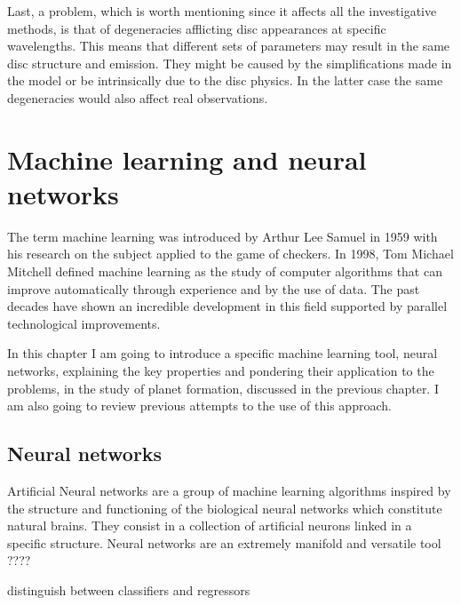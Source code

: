 \documentclass[a4paper,10pt]{report}
\begin{document}
Last, a problem, which is worth mentioning since it affects all the investigative methods,
is that of degeneracies afflicting disc appearances at specific
wavelengths. This means that different sets of parameters may result in the same disc structure and emission.
They might be caused by the simplifications made in the model or be intrinsically due to the disc physics. 
In the latter case the same degeneracies would also affect real observations.

\chapter{Machine learning and neural networks}

The term machine learning was introduced by Arthur Lee Samuel in 1959
with his research on the subject applied to the game of checkers.
In 1998, Tom Michael Mitchell defined machine learning as the study of
computer algorithms that can improve automatically through experience and by the use of data.
The past decades have shown an incredible development in this field supported by parallel 
technological improvements. 

In this chapter I am going to introduce a specific machine learning tool, neural networks, explaining
the key properties and pondering their application to the problems, in the study of planet formation,
discussed in the previous chapter. I am also going to review previous attempts to the use of this approach.

\section{Neural networks}

Artificial Neural networks are a group of machine learning algorithms inspired by the structure and functioning 
of the biological neural networks which constitute natural brains.
They consist in a collection of artificial neurons linked in a specific structure. 
Neural networks are an extremely manifold and versatile tool 
????

distinguish between classifiers and regressors
\end{document}

